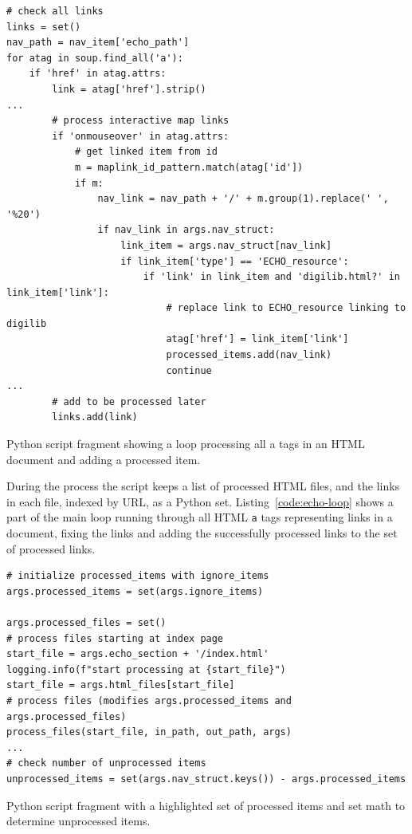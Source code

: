 \documentclass[final]{anthology-ch} %
\begin{document}
\begin{listing}
\begin{verbatim}
# check all links
links = set()
nav_path = nav_item['echo_path']
for atag in soup.find_all('a'):
    if 'href' in atag.attrs:
        link = atag['href'].strip()
...
        # process interactive map links
        if 'onmouseover' in atag.attrs:
            # get linked item from id
            m = maplink_id_pattern.match(atag['id'])
            if m:
                nav_link = nav_path + '/' + m.group(1).replace(' ', '%20')
                if nav_link in args.nav_struct:
                    link_item = args.nav_struct[nav_link]
                    if link_item['type'] == 'ECHO_resource':
                        if 'link' in link_item and 'digilib.html?' in link_item['link']:
                            # replace link to ECHO_resource linking to digilib
                            atag['href'] = link_item['link']
                            processed_items.add(nav_link)
                            continue
...                        
        # add to be processed later
        links.add(link)
\end{verbatim}

\caption{Python script fragment showing a loop processing all a tags in an HTML document and adding a processed item.}
  \label{code:echo-loop}
\end{listing}

During the process the script keeps a list of processed HTML files, and the links in each file, indexed by URL, as a Python set. Listing~\ref{code:echo-loop} shows a part of the main loop running through all HTML \texttt{a} tags representing links in a document, fixing the links and adding the successfully processed links to the set of processed links.

\begin{listing}
\begin{verbatim}
# initialize processed_items with ignore_items
args.processed_items = set(args.ignore_items)

args.processed_files = set()
# process files starting at index page
start_file = args.echo_section + '/index.html'
logging.info(f"start processing at {start_file}")
start_file = args.html_files[start_file]
# process files (modifies args.processed_items and args.processed_files)
process_files(start_file, in_path, out_path, args)
...
# check number of unprocessed items
unprocessed_items = set(args.nav_struct.keys()) - args.processed_items
\end{verbatim}
  \caption{Python script fragment with a highlighted set of processed items and set math to determine unprocessed items.}
  \label{code:echo-tracking}
\end{listing}
\end{document}
